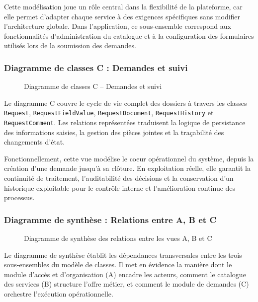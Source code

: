 Cette modélisation joue un rôle central dans la flexibilité de la plateforme, car elle permet d'adapter chaque service à des exigences spécifiques sans modifier l'architecture globale. Dans l'application, ce sous-ensemble correspond aux fonctionnalités d'administration du catalogue et à la configuration des formulaires utilisés lors de la soumission des demandes.

\newpage
\subsubsection{Diagramme de classes C : Demandes et suivi}

\begin{figure}[H]
  \centering
  
  \caption{Diagramme de classes C -- Demandes et suivi}
  \label{fig:dclass_c}
\end{figure}

Le diagramme C couvre le cycle de vie complet des dossiers à travers les classes \texttt{Request}, \texttt{RequestFieldValue}, \texttt{RequestDocument}, \texttt{RequestHistory} et \texttt{RequestComment}. Les relations représentées traduisent la logique de persistance des informations saisies, la gestion des pièces jointes et la traçabilité des changements d'état.

Fonctionnellement, cette vue modélise le coeur opérationnel du système, depuis la création d'une demande jusqu'à sa clôture. En exploitation réelle, elle garantit la continuité de traitement, l'auditabilité des décisions et la conservation d'un historique exploitable pour le contrôle interne et l'amélioration continue des processus.

\newpage
\subsubsection{Diagramme de synthèse : Relations entre A, B et C}

\begin{figure}[H]
  \centering
  
  \caption{Diagramme de synthèse des relations entre les vues A, B et C}
  \label{fig:dclass_synthese}
\end{figure}

Le diagramme de synthèse établit les dépendances transversales entre les trois sous-ensembles du modèle de classes. Il met en évidence la manière dont le module d'accès et d'organisation (A) encadre les acteurs, comment le catalogue des services (B) structure l'offre métier, et comment le module de demandes (C) orchestre l'exécution opérationnelle.

